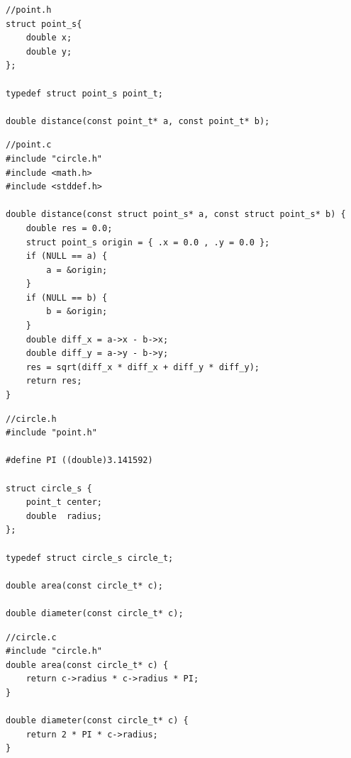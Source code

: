 \documentclass[a4paper]{article}
\begin{document}
\noindent
\begin{minipage}[H]{\linewidth}
\mbox{}
\begin{lstlisting}[style=C,
caption={Ejemplo de redefinición -- \texttt{point.h}},
label={lst:redefInclude}]
//point.h
struct point_s{
    double x;
    double y;
};

typedef struct point_s point_t;

double distance(const point_t* a, const point_t* b);
\end{lstlisting}
\end{minipage}
\noindent
\begin{minipage}[H]{\linewidth}
\mbox{}
\begin{lstlisting}[style=C,
caption={Ejemplo de redefinición -- \texttt{point.c}},
label={lst:redefInclude}]
//point.c
#include "circle.h"
#include <math.h>
#include <stddef.h>

double distance(const struct point_s* a, const struct point_s* b) {
    double res = 0.0;
    struct point_s origin = { .x = 0.0 , .y = 0.0 };
    if (NULL == a) {
        a = &origin;
    }
    if (NULL == b) {
        b = &origin;
    }
    double diff_x = a->x - b->x;
    double diff_y = a->y - b->y;
    res = sqrt(diff_x * diff_x + diff_y * diff_y);
    return res;
}
\end{lstlisting}
\end{minipage}
\noindent
\begin{minipage}[H]{\linewidth}
\mbox{}
\begin{lstlisting}[style=C,
caption={Ejemplo de redefinición -- \texttt{circle.h}},
label={lst:redefInclude}]
//circle.h
#include "point.h"

#define PI ((double)3.141592)

struct circle_s {
    point_t center;
    double  radius;
};

typedef struct circle_s circle_t;

double area(const circle_t* c);

double diameter(const circle_t* c);
\end{lstlisting}
\end{minipage}

\noindent
\begin{minipage}[H]{\linewidth}
\mbox{}
\begin{lstlisting}[style=C,
caption={Ejemplo de redefinición -- \texttt{circle.c}},
label={lst:redefInclude}]
//circle.c
#include "circle.h"
double area(const circle_t* c) {
    return c->radius * c->radius * PI;
}

double diameter(const circle_t* c) {
    return 2 * PI * c->radius;
}
\end{lstlisting}
\end{minipage}
\end{document}
